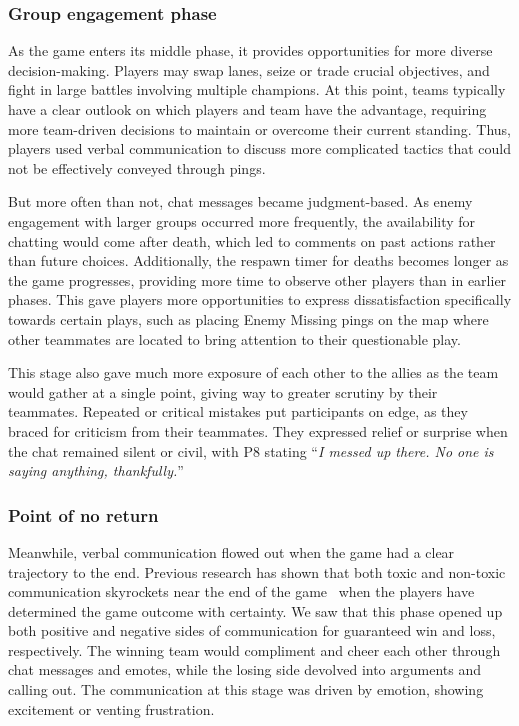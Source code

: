 \subsubsection{Group engagement phase}
As the game enters its middle phase, it provides opportunities for more diverse decision-making. Players may swap lanes, seize or trade crucial objectives, and fight in large battles involving multiple champions. At this point, teams typically have a clear outlook on which players and team have the advantage, requiring more team-driven decisions to maintain or overcome their current standing. Thus, players used verbal communication to discuss more complicated tactics that could not be effectively conveyed through pings.

But more often than not, chat messages became judgment-based. As enemy engagement with larger groups occurred more frequently, the availability for chatting would come after death, which led to comments on past actions rather than future choices. Additionally, the respawn timer for deaths becomes longer as the game progresses, providing more time to observe other players than in earlier phases. This gave players more opportunities to express dissatisfaction specifically towards certain plays, such as placing Enemy Missing pings on the map where other teammates are located to bring attention to their questionable play.

This stage also gave much more exposure of each other to the allies as the team would gather at a single point, giving way to greater scrutiny by their teammates. Repeated or critical mistakes put participants on edge, as they braced for criticism from their teammates. They expressed relief or surprise when the chat remained silent or civil, with P8 stating ``\textit{I messed up there. No one is saying anything, thankfully.}''


\subsubsection{Point of no return}
Meanwhile, verbal communication flowed out when the game had a clear trajectory to the end. Previous research has shown that both toxic and non-toxic communication skyrockets near the end of the game~\cite{kwak2015linguistic} when the players have determined the game outcome with certainty. We saw that this phase opened up both positive and negative sides of communication for guaranteed win and loss, respectively. The winning team would compliment and cheer each other through chat messages and emotes, while the losing side devolved into arguments and calling out. The communication at this stage was driven by emotion, showing excitement or venting frustration.


